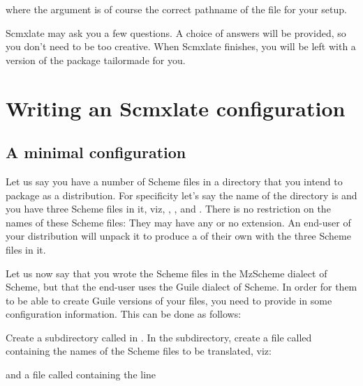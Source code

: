 
\n where the  argument is of course the correct
pathname of the file  for your
setup.

Scmxlate may ask you a few questions.  A
choice of answers will be provided, so you don't need
to be too creative.  When Scmxlate finishes, you
will be left with a version of the package tailormade
for you.

\section{Writing an Scmxlate configuration}
\label{writeconfig}

%

\subsection{A minimal configuration}

Let us say you have a number of Scheme files in
a directory that you intend to package as a
distribution.  For specificity let's say the name of the
directory is  and you have three Scheme files in it,
viz, , , and .
There is no restriction on the names of these Scheme
files: They may have any or no extension.  An end-user
of your distribution will unpack it to produce a
 of their own with the three Scheme files in
it.

Let us now say that you wrote the Scheme files in the
MzScheme dialect of Scheme, but that the end-user
uses the Guile dialect of Scheme.  In order for them to
be able to create Guile versions of your files, you
need to provide in  some configuration
information.  This can be done as follows:

Create a subdirectory called  in
.  In the  subdirectory,
create a file called 
containing the names of the Scheme files to be
translated,  viz:


\n and a file called  containing
the line

